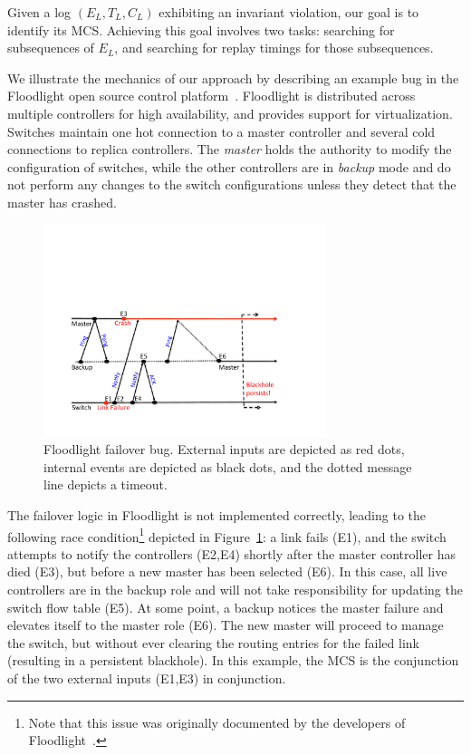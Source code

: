 Given a log $(E_L, T_L, C_L)$ exhibiting an invariant violation,
our goal is to identify its MCS. Achieving this goal involves two tasks:
searching for subsequences of $E_L$, and searching for replay timings for those
subsequences.

We illustrate the mechanics of our approach by describing an example bug in the Floodlight
open source control platform~\cite{floodlight_bug}. Floodlight is distributed across
multiple controllers for high availability, and provides support for
virtualization. Switches maintain one hot connection to a master controller and
several cold connections to replica controllers. The \emph{master} holds the
authority to modify the configuration of switches, while the other
controllers are in \emph{backup} mode and do not perform any changes to the
switch configurations unless they detect that the master has crashed.

\begin{figure}[t]
  \includegraphics[width=3.25in]{../diagrams/case_study/example_bug.pdf}
  \caption[]{\label{fig:example} Floodlight failover bug. External inputs
             are depicted as red dots, internal events are depicted as black
             dots, and the dotted message line depicts a timeout.}
\end{figure}

The failover logic in Floodlight is not implemented correctly, leading to the
following race condition\footnote{Note that this issue was
originally documented by the developers of Floodlight~\cite{floodlight_bug}.} depicted in
Figure~\ref{fig:example}:
a link fails (E1), and the switch attempts to notify the controllers (E2,E4) shortly after the master
controller has died (E3), but before a new master has been selected (E6). In this case, all live controllers are in
the backup role and will not take responsibility for updating the switch
flow table (E5). At some point, a backup notices the master failure and
elevates itself to the master role (E6). The new master will proceed to manage
the switch, but without ever clearing the routing entries for
the failed link (resulting in a persistent blackhole). In this example, the MCS
is the conjunction of the two external inputs (E1,E3) in conjunction.

